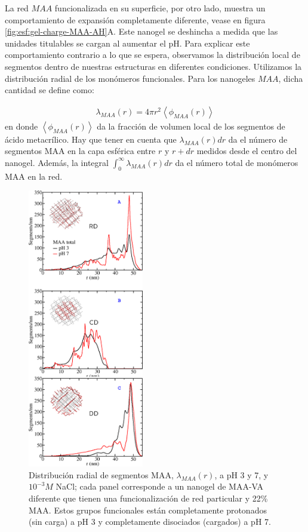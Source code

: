La red $MAA$ funcionalizada en  su superficie, por otro lado, muestra un comportamiento de expansi\'on completamente diferente, vease en figura \ref{fig:esf:gel-charge-MAA-AH}A.
Este nanogel se deshincha a medida que las unidades titulables se cargan al aumentar el pH.
Para explicar este comportamiento contrario a lo que se espera, observamos la distribuci\'on local de segmentos dentro de nuestras estructuras en diferentes condiciones. Utilizamos la distribuci\'on radial de los mon\'omeros funcionales.
Para los nanogeles $MAA$, dicha cantidad se define como:

%
\begin{align}
    \lambda_{MAA}(r)= 4\pi r^2\left<\phi_{MAA}(r)\right>
\end{align}
%
\noindent en donde $\left<\phi_{MAA}(r)\right>$ da la fracci\'on de volumen local de los segmentos de \'acido metacr\'ilico.
Hay que tener en cuenta que $\lambda_{MAA}(r) dr$ da el n\'umero de segmentos MAA en la capa esf\'erica entre $r$ y $r+dr$ medidos desde el centro del nanogel.
Adem\'as, la integral $\int_0^\infty \lambda_{MAA}(r) dr$ da el n\'umero total de mon\'omeros MAA en la red.


\begin{figure}[!htb]
     \centering
     \includegraphics[width=0.45\textwidth]{Figures/graphs-gel2/dist-MAA.png}
     \caption{Distribuci\'on radial de segmentos MAA, $\lambda_{MAA}(r)$, a pH 3 y 7, y $10^{-3}M$ NaCl; cada panel corresponde a un nanogel de  MAA-VA diferente que tienen una funcionalizaci\'on de red particular y 22\% MAA.
     	Estos grupos funcionales est\'an completamente protonados (sin carga) a pH 3 y completamente disociados (cargados) a pH 7.}
     \label{fig:esf:MAA-vs-r-distribution}
 \end{figure}


